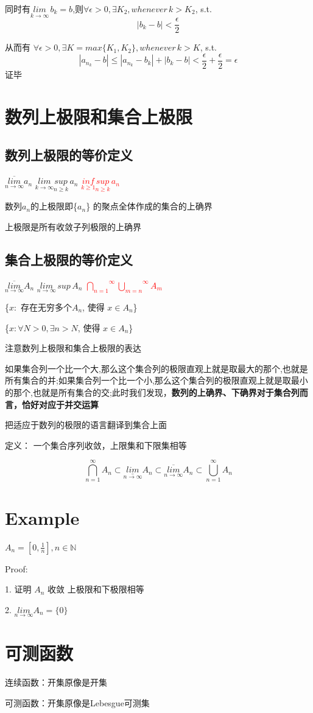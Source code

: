 \documentclass{article}
\begin{document}
同时有$ \underset{k \to \infty}{lim} \, b_k = b $,则$ \forall \epsilon > 0, \exists K_2, whenever \, k > K_2$, s.t.
$$
| b_k - b| < \frac{\epsilon}{2}
$$

从而有 $ \forall \epsilon > 0, \exists K= max\{K_1,K_2\}, whenever \, k > K$, s.t.
$$
  |a_{n_k} -b| \le |a_{n_k} - b_k| + |b_k -b| <   \frac{\epsilon}{2}+\frac{\epsilon}{2} = \epsilon
$$
证毕 



\section{数列上极限和集合上极限}

\subsection{数列上极限的等价定义}

$ \overline{\underset{n \to \infty}{lim}}a_n $ \qquad $\underset{k \to \infty}{lim}\underset{n \ge k}{sup} \,a_n$ \qquad \textcolor{red}{$\underset{k \ge 1}{inf} \underset{n \ge k}{sup } \,a_n $ }

数列$a_n$的上极限即\{$a_n$\} 的聚点全体作成的集合的上确界

上极限是所有收敛⼦列极限的上确界

\subsection{集合上极限的等价定义}

$ \overline{\underset{n \to \infty}{lim}}A_n $ \qquad $\underset{n \to \infty}{lim} \, sup \, A_{n} $ \qquad \textcolor{red}{$ \overset{\infty}{\underset{n=1}{\bigcap}}\overset{\infty}{\underset{m=n}{\bigcup}}A_m$}

\{$x:$ 存在无穷多个$A_n$, 使得 $x \in A_n$\}

\{$x: \forall N >0, \exists n> N$, 使得 $x \in A_n$\}

注意数列上极限和集合上极限的表达

如果集合列一个比一个大,那么这个集合列的极限直观上就是取最大的那个,也就是所有集合的并;如果集合列一个比一个小,那么这个集合列的极限直观上就是取最小的那个,也就是所有集合的交;此时我们发现，\textbf{数列的上确界、下确界对于集合列而言，恰好对应于并交运算}

把适应于数列的极限的语言翻译到集合上面

定义： 一个集合序列收敛，上限集和下限集相等

$$ 
 \overset{\infty}{\underset{n=1}{\bigcap}}A_n \subset \underset{n \to \infty}{\underline{lim}}A_n \subset \overline{\underset{n \to \infty}{lim}}A_n \subset 
 \overset{\infty}{\underset{n=1}{\bigcup}}A_n
$$




\section{Example}
$ A_n = [0, \frac{1}{n}], n \in \mathbb{N}$

Proof: 

1. 证明 ${A_n}$ 收敛 \qquad 上极限和下极限相等

2. $\underset{n \to \infty}{lim} A_n = \{0\}$

\section{可测函数}

连续函数：开集原像是开集

可测函数：开集原像是Lebesgue可测集
\end{document}
